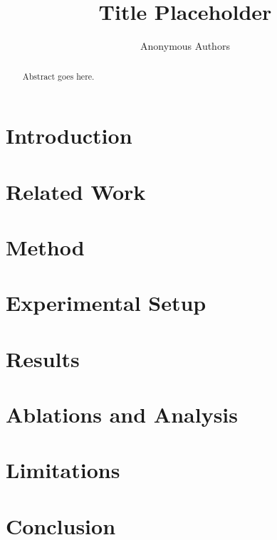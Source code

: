 \documentclass{article}
\title{Title Placeholder}
\author{Anonymous Authors}
\date{}
\begin{document}
\maketitle

\begin{abstract}
Abstract goes here.
\end{abstract}

\section{Introduction}
\section{Related Work}
\section{Method}
\section{Experimental Setup}
\section{Results}
\section{Ablations and Analysis}
\section{Limitations}
\section{Conclusion}



\end{document}
